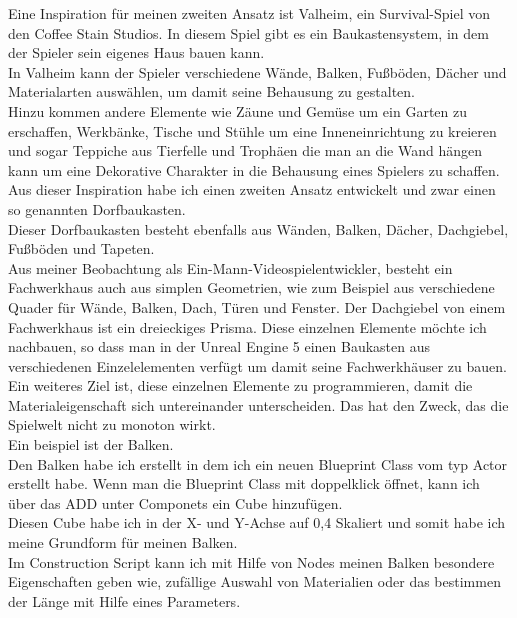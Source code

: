 {Eine Inspiration für meinen zweiten Ansatz ist Valheim, ein Survival-Spiel von den Coffee Stain Studios. In diesem Spiel gibt es ein Baukastensystem, in dem der Spieler sein eigenes Haus bauen kann.
\\
In Valheim kann der Spieler verschiedene Wände, Balken, Fußböden, Dächer und Materialarten auswählen, um damit seine Behausung zu gestalten.
\\
Hinzu kommen andere Elemente wie Zäune und Gemüse um ein Garten zu erschaffen, Werkbänke, Tische und Stühle um eine Inneneinrichtung zu kreieren und sogar Teppiche aus Tierfelle und Trophäen die man an die Wand hängen kann um eine Dekorative Charakter in die Behausung eines Spielers zu schaffen.
\\
Aus dieser Inspiration habe ich einen zweiten Ansatz entwickelt und zwar einen so genannten Dorfbaukasten.
\\
Dieser Dorfbaukasten besteht ebenfalls aus Wänden, Balken, Dächer, Dachgiebel, Fußböden und Tapeten.
\\
Aus meiner Beobachtung als Ein-Mann-Videospielentwickler, besteht ein Fachwerkhaus auch aus simplen Geometrien, wie zum Beispiel aus verschiedene Quader für Wände, Balken, Dach, Türen und Fenster. Der Dachgiebel von einem Fachwerkhaus ist ein dreieckiges Prisma. Diese einzelnen Elemente möchte ich nachbauen, so dass man in der Unreal Engine 5 einen Baukasten aus verschiedenen Einzelelementen verfügt um damit seine Fachwerkhäuser zu bauen. 
\\
Ein weiteres Ziel ist, diese einzelnen Elemente zu programmieren, damit die Materialeigenschaft sich untereinander unterscheiden. Das hat den Zweck, das die Spielwelt nicht zu monoton wirkt.
\\
Ein beispiel ist der Balken.
\\
Den Balken habe ich erstellt in dem ich ein neuen Blueprint Class vom typ Actor erstellt habe. Wenn man die Blueprint Class mit doppelklick öffnet, kann ich über das ADD unter Componets ein Cube hinzufügen.
\\
Diesen Cube habe ich in der X- und Y-Achse auf 0,4 Skaliert und somit habe ich meine Grundform für meinen Balken.
\\
Im Construction Script kann ich mit Hilfe von Nodes meinen Balken besondere Eigenschaften geben wie, zufällige Auswahl von Materialien oder das bestimmen der Länge mit Hilfe eines Parameters.
\\


}
